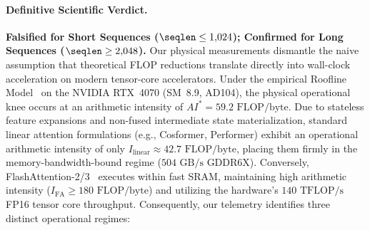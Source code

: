 \paragraph{Definitive Scientific Verdict.}
\textbf{Falsified for Short Sequences ($\seqlen \le 1{,}024$); Confirmed for Long Sequences ($\seqlen \ge 2{,}048$).}
Our physical measurements dismantle the naive assumption that theoretical FLOP reductions translate directly into wall-clock acceleration on modern tensor-core accelerators.
Under the empirical Roofline Model~\cite{williams2009roofline} on the NVIDIA RTX~4070 (SM~8.9, AD104), the physical operational knee occurs at an arithmetic intensity of $AI^* = 59.2\text{ FLOP/byte}$.
Due to stateless feature expansions and non-fused intermediate state materialization, standard linear attention formulations (e.g., Cosformer, Performer) exhibit an operational arithmetic intensity of only $I_{\text{linear}} \approx 42.7\text{ FLOP/byte}$, placing them firmly in the memory-bandwidth-bound regime ($504\text{ GB/s}$ GDDR6X).
Conversely, FlashAttention-2/3~\cite{dao2023flashattention2,shah2024flashattention3} executes within fast SRAM, maintaining high arithmetic intensity ($I_{\text{FA}} \ge 180\text{ FLOP/byte}$) and utilizing the hardware's $140\text{ TFLOP/s}$ FP16 tensor core throughput.
Consequently, our telemetry identifies three distinct operational regimes:
